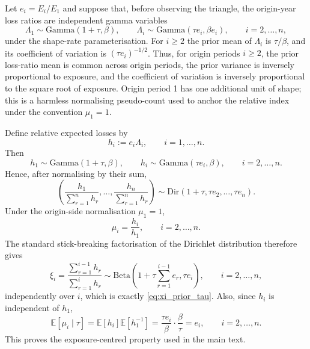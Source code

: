 \documentclass[11pt]{article}
\newcommand{\E}{\mathbb{E}}
\newcommand{\1}{\mathbf{1}}
\newcommand{\Dir}{\mathrm{Dir}}
\newcommand{\BetaD}{\mathrm{Beta}}
\newcommand{\GammaD}{\mathrm{Gamma}}
\begin{document}
Let $e_i=E_i/E_1$ and suppose that, before observing the triangle, the origin-year loss ratios are independent gamma variables
\begin{equation}
\Lambda_1\sim\GammaD(1+\tau,\beta),
\qquad
\Lambda_i\sim\GammaD(\tau e_i,\beta e_i),
\qquad i=2,\dots,n,
\label{eq:lambda_prior_tau_app}
\end{equation}
under the shape-rate parameterisation. For $i\ge2$ the prior mean of $\Lambda_i$ is $\tau/\beta$, and its coefficient of variation is $(\tau e_i)^{-1/2}$. Thus, for origin periods $i\ge2$, the prior loss-ratio mean is common across origin periods, the prior variance is inversely proportional to exposure, and the coefficient of variation is inversely proportional to the square root of exposure. Origin period 1 has one additional unit of shape; this is a harmless normalising pseudo-count used to anchor the relative index under the convention $\mu_1=1$.

Define relative expected losses by
\begin{equation}
h_i:=e_i\Lambda_i,
\qquad i=1,\dots,n.
\label{eq:h_i_def_app}
\end{equation}
Then
\begin{equation}
h_1\sim\GammaD(1+\tau,\beta),
\qquad
h_i\sim\GammaD(\tau e_i,\beta),
\qquad i=2,\dots,n.
\label{eq:h_i_gamma_tau_app}
\end{equation}
Hence, after normalising by their sum,
\begin{equation}
\left(\frac{h_1}{\sum_{r=1}^{n}h_r},\dots,\frac{h_n}{\sum_{r=1}^{n}h_r}\right)
\sim
\Dir(1+\tau,\tau e_2,\dots,\tau e_n).
\label{eq:q_dirichlet_app}
\end{equation}
Under the origin-side normalisation $\mu_1=1$,
\begin{equation}
\mu_i=\frac{h_i}{h_1},
\qquad i=2,\dots,n.
\label{eq:mu_from_h_app}
\end{equation}
The standard stick-breaking factorisation of the Dirichlet distribution therefore gives
\begin{equation}
\xi_i
=
\frac{\sum_{r=1}^{i-1}h_r}{\sum_{r=1}^{i}h_r}
\sim
\BetaD\!\left(1+\tau\sum_{r=1}^{i-1}e_r,\tau e_i\right),
\qquad i=2,\dots,n,
\label{eq:xi_prior_tau_app}
\end{equation}
independently over $i$, which is exactly \eqref{eq:xi_prior_tau}. Also, since $h_i$ is independent of $h_1$,
\begin{equation}
\E[\mu_i\mid\tau]
=
\E[h_i]\E[h_1^{-1}]
=
\frac{\tau e_i}{\beta}\cdot\frac{\beta}{\tau}
=e_i,
\qquad i=2,\dots,n.
\label{eq:mu_mean_tau_app}
\end{equation}
This proves the exposure-centred property used in the main text.
\end{document}
